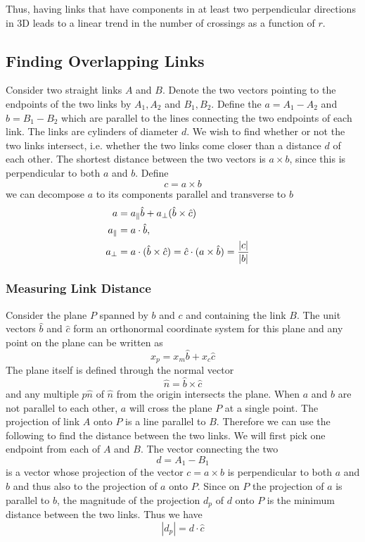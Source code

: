 \documentclass[endfloats,nofootinbib,preprint,floatfix,titlepage,superscriptaddress,linenumbers]{revtex4-1} %
\begin{document}
Thus, having links that have components in at least two perpendicular directions in 3D leads to a linear trend in the number of crossings as a function of $r$.  


\subsection{Finding Overlapping Links}
Consider two straight links $A$ and $B$. Denote the two vectors pointing to the endpoints of the two links by $A_1,A_2$ and $B_1,B_2$. Define the $a= A_1 - A_2$ and $ b= B_1 -B_2$ which are parallel to the lines connecting the two endpoints of each link. The links are cylinders of diameter $d$. We wish to find whether or not the two links intersect, i.e. whether the two links come closer than a distance $d$ of each other. The shortest distance between the two vectors is $a \times b$, since this is perpendicular to both $a$ and $b$. Define
\[c = a\times b\]
we can decompose $ a$ to its components parallel and transverse to $b$ 
\begin{align}
a &= a_\parallel \hat{b}+ a_\perp (\hat{b}\times \hat{c})\cr
a_\parallel &= a\cdot \hat{b}, \cr
a_\perp &= a \cdot (\hat{b}\times \hat{c}) = \hat{c} \cdot (a\times \hat{b})= {|c|\over |b|}
\end{align}

\subsubsection{Measuring Link Distance}
Consider the plane $P$ spanned by $b$ and $c$ and containing the link $B$. The unit vectors $\hat{b}$ and $\hat{c}$ form an orthonormal coordinate system for this plane and any point on the plane can be written as
\[x_p = x_m \hat{b}+ x_c\hat{c}\]
The plane itself is defined through the normal vector 
\[\hat{n}= \hat{b}\times\hat{c}\]
and any multiple $p\hat{n}$ of $\hat{n}$ from the origin intersects the plane.
When $ a$ and $b$ are not parallel to each other, $a$ will cross the plane $P$ at a single point. The projection of link $A$ onto $P$ is a line parallel to $B$. Therefore we can use the following to find the distance between the two links. We will first pick one endpoint from each of $A$ and $B$. The vector connecting the two
\[d = A_1-B_1\]
is a vector whose projection of the vector $c = a\times b$ is perpendicular to both $a$ and $b$ and thus also to the projection of $a$ onto $P$. Since on $P$ the projection of $a$ is parallel to $b$, the magnitude of the projection $d_p$ of $d$ onto $P$ is the minimum distance between the two links. Thus we have
\[|d_p| = d \cdot \hat{c}\]
\end{document}
